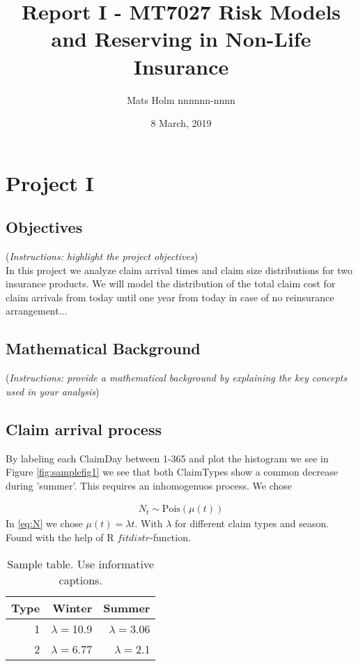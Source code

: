 \documentclass[11pt]{article}
\title{Report I - MT7027 Risk Models and Reserving in Non-Life Insurance}
\author{Mats Holm nnnnnn-nnnn }
\date{8 March, 2019}                                           %
\begin{document}
\maketitle
\section*{Project I}
\subsection*{Objectives}
({\it Instructions: highlight the project objectives})
\\
In this project we analyze claim
arrival times and claim size distributions for two insurance products.
We will model
the distribution of the total claim cost for claim arrivals from today until one year from
today in case of no reinsurance arrangement...

\subsection*{Mathematical Background}
({\it Instructions: provide a mathematical background by explaining the key concepts used in your analysis})

\subsection*{Claim arrival process}
By labeling each ClaimDay between 1-365 and plot the histogram we see in Figure \ref{fig:samplefig1} we see that both ClaimTypes show a common decrease during 'summer'. This requires an inhomogenuos process. We chose

\begin{align}\label{eq:N}
	N_t  \sim  \mathrm{Pois}(\mu(t))
\end{align}
In \eqref{eq:N} we chose $\mu(t) = \lambda t$. With $\lambda$ for different claim types and season. Found with the help of R $fitdistr$-function.


\begin{table}[!ht]
\center
\begin{tabular}{r|rr}
Type & Winter & Summer \\ 
\hline
1 & $\lambda=$10.9 & $\lambda=$3.06 \\
2 & $\lambda=$6.77 & $\lambda=$2.1\\
\hline
\end{tabular}
\caption{Sample table. Use informative captions.} \label{tab:sampletab}
\end{table}
\end{document}
